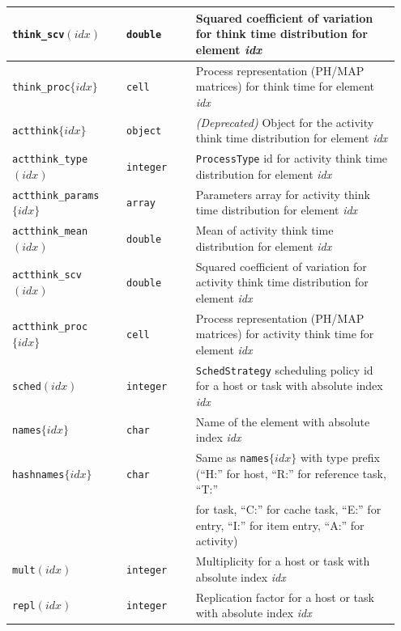 \begin{MATLAB}
{\begin{longtable}{|p{0.28\linewidth}|p{0.17\linewidth}|p{0.50\linewidth}|}
\texttt{think\_scv}$(idx)$ & \texttt{double} & Squared coefficient of variation for think time distribution for element \textit{idx} \\\hline
\texttt{think\_proc}$\{idx\}$ & \texttt{cell} & Process representation (PH/MAP matrices) for think time for element \textit{idx} \\\hline
\texttt{actthink}$\{idx\}$ & \texttt{object} & \textit{(Deprecated)} Object for the activity think time distribution for element \textit{idx} \\\hline
\texttt{actthink\_type}$(idx)$ & \texttt{integer} & \texttt{ProcessType} id for activity think time distribution for element \textit{idx} \\\hline
\texttt{actthink\_params}$\{idx\}$ & \texttt{array} & Parameters array for activity think time distribution for element \textit{idx} \\\hline
\texttt{actthink\_mean}$(idx)$ & \texttt{double} & Mean of activity think time distribution for element \textit{idx} \\\hline
\texttt{actthink\_scv}$(idx)$ & \texttt{double} & Squared coefficient of variation for activity think time distribution for element \textit{idx} \\\hline
\texttt{actthink\_proc}$\{idx\}$ & \texttt{cell} & Process representation (PH/MAP matrices) for activity think time for element \textit{idx} \\\hline
\texttt{sched}$(idx)$ & \texttt{integer} & \texttt{SchedStrategy} scheduling policy id for a host or task with absolute index \textit{idx} \\\hline
\texttt{names}$\{idx\}$ & \texttt{char} & Name of the element with absolute index \textit{idx} \\\hline
\texttt{hashnames}$\{idx\}$ & \texttt{char} & Same as \texttt{names}$\{idx\}$ with type prefix (``H:'' for host, ``R:'' for reference task, ``T:'' \\
 &  & for task, ``C:'' for cache task, ``E:'' for entry, ``I:'' for item entry, ``A:'' for activity) \\\hline
 \texttt{mult}$(idx)$ & \texttt{integer} & Multiplicity for a host or task with absolute index \textit{idx} \\\hline
 \texttt{repl}$(idx)$ & \texttt{integer} & Replication factor for a host or task with absolute index \textit{idx} \\\hline

\end{longtable}}
\end{MATLAB}
